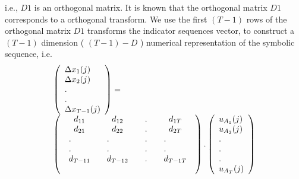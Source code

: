 \documentclass[preprint,authoryear,12pt]{elsarticle}
\begin{document}
i.e., $D1$ is an orthogonal matrix. It is known that the orthogonal matrix $D1$ corresponds to a orthogonal transform. We use the first $(T-1)$ rows of the orthogonal matrix $D1$    transforms the indicator sequences vector, to construct a $(T-1)$ dimension ( $(T-1)-D$ ) numerical representation of the symbolic sequence, i.e.
$$
\begin{array}{l}
 \left( \begin{array}{l}
 \Delta x_1 (j) \\
 \Delta x_2 (j) \\
 . \\
 . \\
 \Delta x_{T - 1} (j) \\
 \end{array} \right) =  \\
 \left( {\begin{array}{*{20}c}
   {d_{11} } & {d_{12} } & . & {d_{1T} }  \\
   {d_{21} } & {d_{22} } & . & {d_{2T} }  \\
   \begin{array}{l}
 . \\
 . \\
 d_{T - 11}  \\
 \end{array} & \begin{array}{l}
 . \\
 . \\
 d_{T - 12}  \\
 \end{array} & \begin{array}{l}
 . \\
 . \\
 . \\
 \end{array} & \begin{array}{l}
 . \\
 . \\
 d_{T - 1T}  \\
 \end{array}  \\
   {} & {} & {} & {}  \\
\end{array}} \right).\left( \begin{array}{l}
 u_{A_1}(j) \\
 u_{A_2}(j) \\
 . \\
 . \\
 . \\
 u_{A_T} (j) \\
 \end{array} \right) \\
 \end{array}
$$
\end{document}
